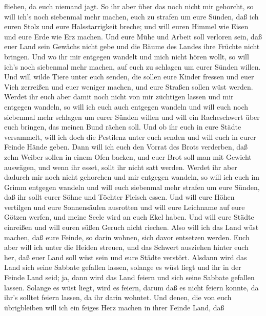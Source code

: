 fliehen, da euch niemand jagt.  So ihr aber über das noch
nicht mir gehorcht, so will ich's noch siebenmal mehr machen, euch zu
strafen um eure Sünden,  daß ich euren Stolz und eure
Halsstarrigkeit breche; und will euren Himmel wie Eisen und eure Erde
wie Erz machen.  Und eure Mühe und Arbeit soll verloren
sein, daß euer Land sein Gewächs nicht gebe und die Bäume des Landes
ihre Früchte nicht bringen.  Und wo ihr mir entgegen
wandelt und mich nicht hören wollt, so will ich's noch siebenmal mehr
machen, auf euch zu schlagen um eurer Sünden willen.  Und
will wilde Tiere unter euch senden, die sollen eure Kinder fressen und
euer Vieh zerreißen und euer weniger machen, und eure Straßen sollen
wüst werden.  Werdet ihr euch aber damit noch nicht von mir
züchtigen lassen und mir entgegen wandeln,  so will ich
euch auch entgegen wandeln und will euch noch siebenmal mehr schlagen um
eurer Sünden willen  und will ein Racheschwert über euch
bringen, das meinen Bund rächen soll. Und ob ihr euch in eure Städte
versammelt, will ich doch die Pestilenz unter euch senden und will euch
in eurer Feinde Hände geben.  Dann will ich euch den Vorrat
des Brots verderben, daß zehn Weiber sollen in einem Ofen backen, und
euer Brot soll man mit Gewicht auswägen, und wenn ihr esset, sollt ihr
nicht satt werden.  Werdet ihr aber dadurch mir noch nicht
gehorchen und mir entgegen wandeln,  so will ich euch im
Grimm entgegen wandeln und will euch siebenmal mehr strafen um eure
Sünden,  daß ihr sollt eurer Söhne und Töchter Fleisch
essen.  Und will eure Höhen vertilgen und eure Sonnensäulen
ausrotten und will eure Leichname auf eure Götzen werfen, und meine
Seele wird an euch Ekel haben.  Und will eure Städte
einreißen und will euren süßen Geruch nicht riechen.  Also
will ich das Land wüst machen, daß eure Feinde, so darin wohnen, sich
davor entsetzen werden.  Euch aber will ich unter die
Heiden streuen, und das Schwert ausziehen hinter euch her, daß euer Land
soll wüst sein und eure Städte verstört.  Alsdann wird das
Land sich seine Sabbate gefallen lassen, solange es wüst liegt und ihr
in der Feinde Land seid; ja, dann wird das Land feiern und sich seine
Sabbate gefallen lassen.  Solange es wüst liegt, wird es
feiern, darum daß es nicht feiern konnte, da ihr's solltet feiern
lassen, da ihr darin wohntet.  Und denen, die von euch
übrigbleiben will ich ein feiges Herz machen in ihrer Feinde Land, daß
